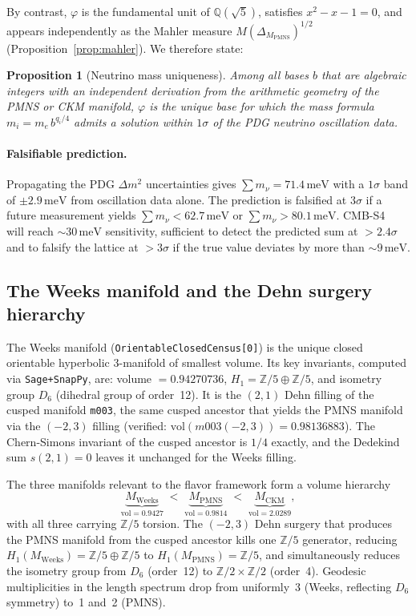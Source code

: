 \documentclass[12pt]{article}
\newtheorem{proposition}[theorem]{Proposition}
\theoremstyle{definition}
\begin{document}
By contrast, $\varphi$ is the fundamental unit of $\mathbb{Q}(\sqrt{5})$,
satisfies $x^2-x-1=0$, and appears independently as the Mahler measure
$M(\Delta_{M_\text{PMNS}})^{1/2}$ (Proposition~\ref{prop:mahler}).
We therefore state:

\begin{proposition}[Neutrino mass uniqueness]
\label{prop:neutrino}
Among all bases $b$ that are algebraic integers with an independent
derivation from the arithmetic geometry of the PMNS or CKM manifold,
$\varphi$ is the unique base for which the mass formula
$m_i = m_e\,b^{q_i/4}$ admits a solution within $1\sigma$ of the
PDG neutrino oscillation data.
\end{proposition}

\paragraph{Falsifiable prediction.}
Propagating the PDG $\Delta m^2$ uncertainties gives
$\sum m_\nu = 71.4\,\text{meV}$ with a $1\sigma$ band of
$\pm 2.9\,\text{meV}$ from oscillation data alone.  The prediction is
falsified at $3\sigma$ if a future measurement yields
$\sum m_\nu < 62.7\,\text{meV}$ or $\sum m_\nu > 80.1\,\text{meV}$.
CMB-S4~\cite{CMBS4} will reach $\sim30\,\text{meV}$ sensitivity,
sufficient to detect the predicted sum at $>2.4\sigma$ and to
falsify the lattice at $>3\sigma$ if the true value deviates
by more than $\sim9\,\text{meV}$.


\subsection{The Weeks manifold and the Dehn surgery hierarchy}
\label{subsec:weeks}

The Weeks manifold (\texttt{OrientableClosedCensus[0]}) is the unique
closed orientable hyperbolic 3-manifold of smallest volume.
Its key invariants, computed via \texttt{Sage+SnapPy}, are:
volume $= 0.94270736$, $H_1 = \mathbb{Z}/5 \oplus \mathbb{Z}/5$,
and isometry group $D_6$ (dihedral group of order~12).
It is the $(2,1)$ Dehn filling of the cusped manifold \texttt{m003},
the same cusped ancestor that yields the PMNS manifold via the $(-2,3)$
filling (verified: $\mathrm{vol}(m003(-2,3)) = 0.98136883$).
The Chern-Simons invariant of the cusped ancestor is $1/4$ exactly,
and the Dedekind sum $s(2,1)=0$ leaves it unchanged for the Weeks filling.

The three manifolds relevant to the flavor framework form a
volume hierarchy
\[
\underbrace{M_{\mathrm{Weeks}}}_{\mathrm{vol}=0.9427}
\;<\;
\underbrace{M_{\mathrm{PMNS}}}_{\mathrm{vol}=0.9814}
\;<\;
\underbrace{M_{\mathrm{CKM}}}_{\mathrm{vol}=2.0289},
\]
with all three carrying $\mathbb{Z}/5$ torsion.
The $(-2,3)$ Dehn surgery that produces the PMNS manifold from the
cusped ancestor kills one $\mathbb{Z}/5$ generator, reducing
$H_1(M_{\mathrm{Weeks}}) = \mathbb{Z}/5 \oplus \mathbb{Z}/5$ to
$H_1(M_{\mathrm{PMNS}}) = \mathbb{Z}/5$,
and simultaneously reduces the isometry group from $D_6$ (order~12)
to $\mathbb{Z}/2 \times \mathbb{Z}/2$ (order~4).
Geodesic multiplicities in the length spectrum drop from uniformly~3
(Weeks, reflecting $D_6$ symmetry) to~1 and~2 (PMNS).
\end{document}
